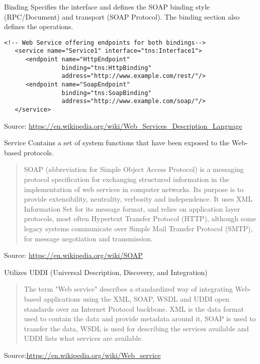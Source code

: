 \documentclass[Screen16to9,17pt]{foils}
\begin{document}
Binding	Specifies the interface and defines the SOAP binding style (RPC/Document) and transport (SOAP Protocol). The binding section also defines the operations.


\begin{verbatim}
<!-- Web Service offering endpoints for both bindings-->
   <service name="Service1" interface="tns:Interface1">
      <endpoint name="HttpEndpoint"
                binding="tns:HttpBinding"
                address="http://www.example.com/rest/"/>
      <endpoint name="SoapEndpoint"
                binding="tns:SoapBinding"
                address="http://www.example.com/soap/"/>
   </service>
\end{verbatim}
Source: \url{https://en.wikipedia.org/wiki/Web_Services_Description_Language}

Service	Contains a set of system functions that have been exposed to the Web-based protocols.



\begin{quote}
SOAP (abbreviation for Simple Object Access Protocol) is a messaging protocol specification for exchanging structured information in the implementation of web services in computer networks. Its purpose is to provide extensibility, neutrality, verbosity and independence. It uses XML Information Set for its message format, and relies on application layer protocols, most often Hypertext Transfer Protocol (HTTP), although some legacy systems communicate over Simple Mail Transfer Protocol (SMTP), for message negotiation and transmission.
\end{quote}
Source: \url{https://en.wikipedia.org/wiki/SOAP}


Utilizes  UDDI (Universal Description, Discovery, and Integration)


\begin{quote}
The term "Web service" describes a standardized way of integrating Web-based applications using the XML, SOAP, WSDL and UDDI open standards over an Internet Protocol backbone. XML is the data format used to contain the data and provide metadata around it, SOAP is used to transfer the data, WSDL is used for describing the services available and UDDI lists what services are available.
\end{quote}
Source:\url{https://en.wikipedia.org/wiki/Web_service}
\end{document}
